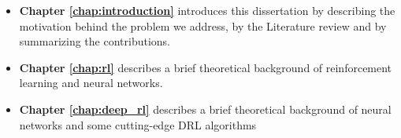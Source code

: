 \begin{itemize}
    \item \textbf{Chapter \ref{chap:introduction}} introduces this dissertation by describing the motivation 
    behind the problem we address, by the Literature review and by summarizing the contributions.

    \item \textbf{Chapter \ref{chap:rl}} describes a brief theoretical background of reinforcement learning and neural networks.
    
    \item \textbf{Chapter \ref{chap:deep_rl}} describes a brief theoretical background of neural networks and some cutting-edge DRL algorithms






\end{itemize}
